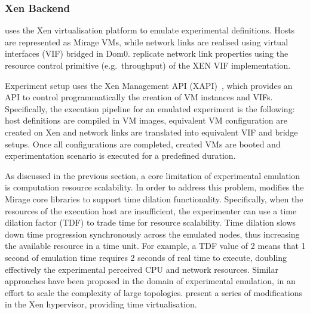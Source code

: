 \subsubsection{Xen Backend} \label{sec:sdnsim:xen-backend}

\sdnsim uses the Xen virtualisation platform to emulate experimental
definitions. Hosts are represented as Mirage VMs, while network links are
realised using virtual interfaces (VIF) bridged in Dom0. \sdnsim replicate
network link properties using the resource control primitive (e.g.~throughput)
of the XEN VIF implementation.

Experiment setup uses the Xen Management API (XAPI)~, which
provides an API to control programmatically the creation of VM instances and
VIFs. Specifically, the execution pipeline for an emulated experiment is the
following: host definitions are compiled in VM images, equivalent VM
configuration are created on Xen and network links are translated into
equivalent VIF and bridge setups. Once all configurations are completed,
created VMs are booted and experimentation scenario is executed for a
predefined duration.

As discussed in the previous section, a core limitation of experimental
emulation is computation resource scalability. In order to address this
problem,  \sdnsim modifies the Mirage core libraries to support time dilation
functionality.  Specifically, when the resources of the execution host are
insufficient, the experimenter can use a time dilation factor (TDF) to trade
time for resource scalability. Time dilation slows down time progression
synchronously across the emulated nodes, thus increasing the available resource
in a time unit. For example, a TDF value of 2 means that 1 second of emulation
time requires 2 seconds of real time to execute, doubling effectively the
experimental perceived CPU and network resources. Similar approaches have been
proposed in the domain of experimental emulation, in an effort to scale the
complexity of large topologies.   present a series of
modifications in the Xen hypervisor, providing time virtualisation.

